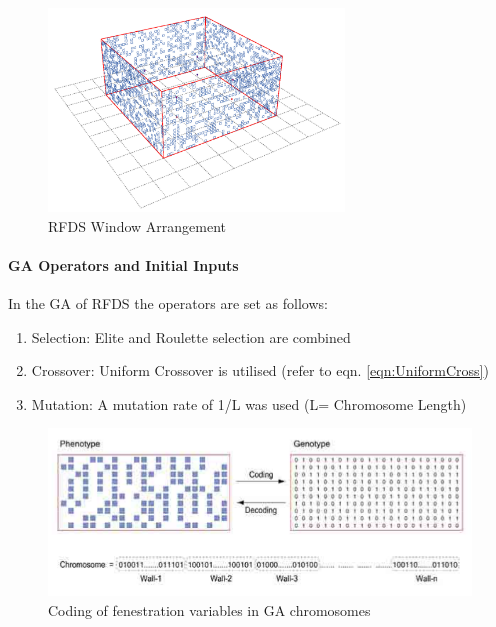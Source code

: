 \begin{figure}[H]
\centering
\includegraphics[width=0.7\textwidth]{./Images/26-RFDSWindows}
\caption[RFDS Window Arrangement]{RFDS Window Arrangement \cite{kawakita08}}
\label{fig:RFDSWin}
\end{figure}

\paragraph{GA Operators and Initial Inputs}\mbox{}

In the GA of RFDS the operators are set as follows:

\begin{enumerate}[nolistsep]
\item Selection: Elite and Roulette selection are combined
\item Crossover: Uniform Crossover is utilised (refer to eqn. \ref{eqn:UniformCross})
\item Mutation: A mutation rate of 1/L was used (L= Chromosome Length)
\end{enumerate}

\begin{figure}[hbtp]
\centering
\includegraphics[width=\textwidth]{../Chapter3/Images/17-kawakitaChromo}
\caption[Chromosome Coding]{Coding of fenestration variables in GA chromosomes \cite{kawakita08}}
\label{kawakitaChromo}
\end{figure}

